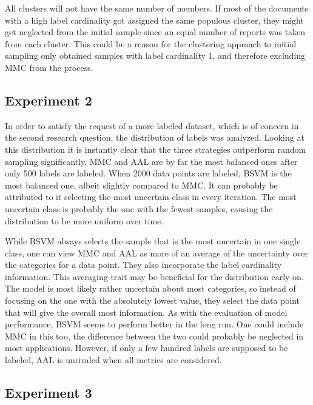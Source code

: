 All clusters will not have the same number of members.
If most of the documents with a high label cardinality got assigned the same populous cluster, they might get neglected from the initial sample since an equal number of reports was taken from each cluster.
This could be a reason for the clustering approach to initial sampling only obtained samples with label cardinality 1, and therefore excluding MMC from the process.

\subsection{Experiment 2}

In order to satisfy the request of a more labeled dataset, which is of concern in the second research question, the distribution of labels was analyzed.
Looking at this distribution it is instantly clear that the three strategies outperform random sampling significantly.
MMC and AAL are by far the most balanced ones after only 500 labels are labeled.
When 2000 data points are labeled, BSVM is the most balanced one, albeit slightly compared to MMC.
It can probably be attributed to it selecting the most uncertain class in every iteration.
The most uncertain class is probably the one with the fewest samples, causing the distribution to be more uniform over time.

While BSVM always selects the sample that is the most uncertain in one single class, one can view MMC and AAL as more of an average of the uncertainty over the categories for a data point.
They also incorporate the label cardinality information.
This averaging trait may be beneficial for the distribution early on.
The model is most likely rather uncertain about most categories, so instead of focusing on the one with the absolutely lowest value, they select the data point that will give the overall most information.
As with the evaluation of model performance, BSVM seems to perform better in the long run.
One could include MMC in this too, the difference between the two could probably be neglected in most applications.
However, if only a few hundred labels are supposed to be labeled, AAL is unrivaled when all metrics are considered.

\subsection{Experiment 3}

